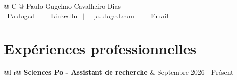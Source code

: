 \documentclass[a4paper,12pt]{article}
\begin{document}
\pagestyle{empty} 



\begin{tabularx}{\linewidth}{@{} C @{}}
\Huge{Paulo Gugelmo Cavalheiro Dias} \\[7.5pt]
\href{https://github.com/Paulogcd}{\raisebox{-0.05\height}\faGithub\ Paulogcd} \ $|$ \ 
\href{https://www.linkedin.com/in/paulo-gugelmo-cavalheiro-dias/}{\raisebox{-0.05\height}\faLinkedin\ LinkedIn} \ $|$ \ 
\href{https://paulogcd.com}{\raisebox{-0.05\height}\faGlobe \ paulogcd.com} \ $|$ \ 
\href{mailto:paulo.gugelmocavalheirodias@sciencespo.fr}{\raisebox{-0.05\height}\faEnvelope \ Email} \ 
\end{tabularx}


\hfill \break

\section{Expériences professionnelles}

\begin{tabularx}{\linewidth}{ @{}l r@{} }
\textbf{Sciences Po - Assistant de recherche} & \hfill Septembre 2026 - Présent \\
\multicolumn{2}{@{}X@{}}{
} \
\end{tabularx}
\end{document}
